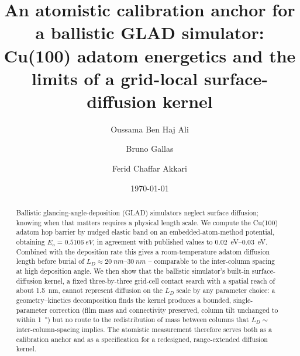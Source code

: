 \documentclass[aip,jcp,amsmath,amssymb,reprint]{revtex4-1}
\begin{document}
\title{An atomistic calibration anchor for a ballistic GLAD simulator:
Cu(100) adatom energetics and the limits of a grid-local surface-diffusion
kernel}

\author{Oussama Ben Haj Ali}
\author{Bruno Gallas}
\author{Ferid Chaffar Akkari}

\date{\today}

\begin{abstract}
Ballistic glancing-angle-deposition (GLAD) simulators neglect surface diffusion;
knowing when that matters requires a physical length scale. We compute the
Cu(100) adatom hop barrier by nudged elastic band on an embedded-atom-method
potential, obtaining $E_a = \SI{0.5106}{eV}$, in agreement with published values
to \SIrange{0.02}{0.03}{eV}. Combined with the deposition rate this gives a
room-temperature adatom diffusion length before burial of
$L_D \approx \SIrange{20}{30}{nm}$ -- comparable to the inter-column spacing at
high deposition angle. We then show that the ballistic simulator's built-in
surface-diffusion kernel, a fixed three-by-three grid-cell contact search with a
spatial reach of about \SI{1.5}{nm}, cannot represent diffusion on the $L_D$
scale by any parameter choice: a geometry--kinetics decomposition finds the
kernel produces a bounded, single-parameter correction (film mass and
connectivity preserved, column tilt unchanged to within \SI{1}{\degree}) but no
route to the redistribution of mass between columns that $L_D \sim$
inter-column-spacing implies. The atomistic measurement therefore serves both as
a calibration anchor and as a specification for a redesigned, range-extended
diffusion kernel.
\end{abstract}

\maketitle

\end{document}
